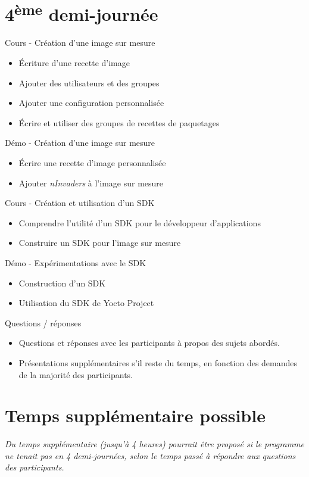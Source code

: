 \documentclass[a4paper,12pt,obeyspaces,spaces,hyphens]{article}
\begin{document}
\section{4\textsuperscript{ème} demi-journée}

\feagendatwocolumn
{Cours - Création d'une image sur mesure}
{
  \begin{itemize}
  \item Écriture d'une recette d'image
  \item Ajouter des utilisateurs et des groupes
  \item Ajouter une configuration personnalisée
  \item Écrire et utiliser des groupes de recettes de paquetages
  \end{itemize}
}
{Démo - Création d'une image sur mesure}
{
  \begin{itemize}
  \item Écrire une recette d'image personnalisée
  \item Ajouter {\em nInvaders} à l'image sur mesure
  \end{itemize}
}
\feagendatwocolumn
{Cours - Création et utilisation d'un SDK}
{
  \begin{itemize}
  \item Comprendre l'utilité d'un SDK pour le développeur d'applications
  \item Construire un SDK pour l'image sur mesure
  \end{itemize}
}
{Démo - Expérimentations avec le SDK}
{
  \begin{itemize}
  \item Construction d'un SDK
  \item Utilisation du SDK de Yocto Project
  \end{itemize}
}

\feagendaonecolumn
{Questions / réponses}
{
  \begin{itemize}
  \item Questions et réponses avec les participants à propos des sujets abordés.
  \item Présentations supplémentaires s'il reste du temps, en fonction des demandes
        de la majorité des participants.
  \end{itemize}
}

\section{Temps supplémentaire possible}

{\em Du temps supplémentaire (jusqu'à 4 heures) pourrait être proposé si le programme ne tenait
     pas en 4 demi-journées, selon le temps passé à répondre aux questions des participants.}
\end{document}
